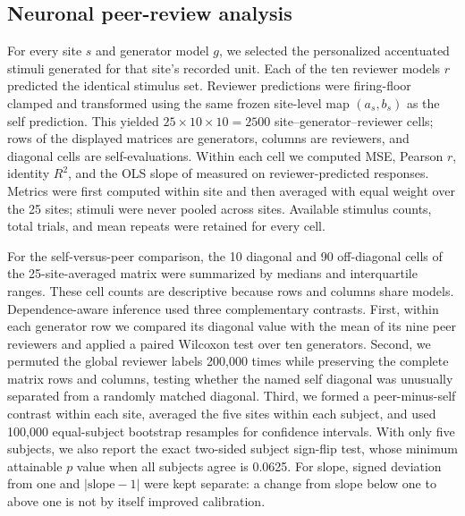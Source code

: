 \subsection{Neuronal peer-review analysis}
\label{sec:app-methods-peer}
For every site $s$ and generator model $g$, we selected the personalized
accentuated stimuli generated for that site's recorded unit.  Each of the ten
reviewer models $r$ predicted the identical stimulus set.  Reviewer predictions
were firing-floor clamped and transformed using the same frozen site-level
map $(a_s,b_s)$ as the self prediction.  This yielded
$25\times10\times10=2500$ site--generator--reviewer cells; rows of the displayed
matrices are generators, columns are reviewers, and diagonal cells are
self-evaluations.  Within each cell we computed MSE, Pearson $r$, identity
$R^2$, and the OLS slope of measured on reviewer-predicted responses.  Metrics
were first computed within site and then averaged with equal weight over the
25 sites; stimuli were never pooled across sites.  Available stimulus counts,
total trials, and mean repeats were retained for every cell.

For the self-versus-peer comparison, the 10 diagonal and 90 off-diagonal cells
of the 25-site-averaged matrix were summarized by medians and interquartile
ranges.  These cell counts are descriptive because rows and columns share
models.  Dependence-aware inference used three complementary contrasts.  First,
within each generator row we compared its diagonal value with the mean of its
nine peer reviewers and applied a paired Wilcoxon test over ten generators.
Second, we permuted the global reviewer labels 200,000 times while preserving
the complete matrix rows and columns, testing whether the named self diagonal
was unusually separated from a randomly matched diagonal.  Third, we formed a
peer-minus-self contrast within each site, averaged the five sites within each
subject, and used 100,000 equal-subject bootstrap resamples for confidence
intervals.  With only five subjects, we also report the exact two-sided
subject sign-flip test, whose minimum attainable $p$ value when all subjects
agree is 0.0625.  For slope, signed deviation from one and
$|\mathrm{slope}-1|$ were kept separate: a change from slope below one to above
one is not by itself improved calibration.

